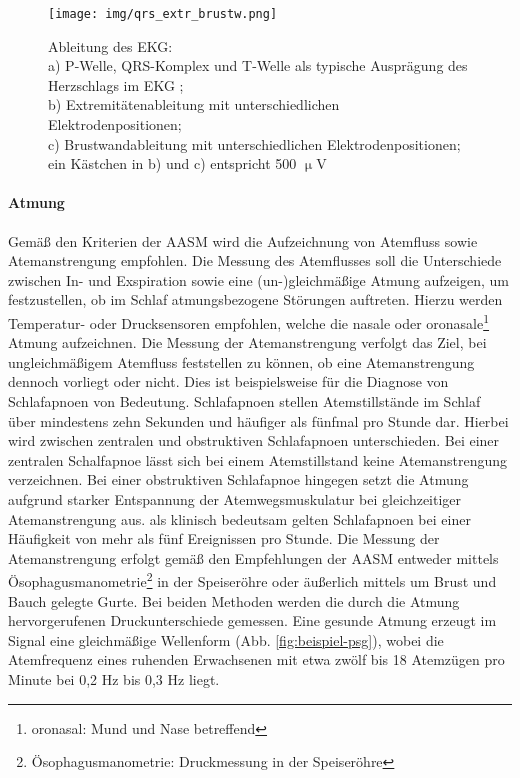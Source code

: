 \begin{figure}[H]
	\centering
	\texttt{[image: img/qrs\_extr\_brustw.png]}
	\caption[Ableitung des \acs{EKG}]{Ableitung des \acs{EKG}:\\a) P-Welle, QRS-Komplex und T-Welle als typische Ausprägung des Herzschlags im \acs{EKG} \parencite{oresick_kania_ekg_2016};\\b) Extremitätenableitung mit unterschiedlichen Elektrodenpositionen;\\c) Brustwandableitung mit unterschiedlichen Elektrodenpositionen;\\ein Kästchen in b) und c) entspricht 500 $\upmu$V \parencite{bamberger_1x1_2015}}
	\label{fig:qrs_extr_brustw}
\end{figure}

\paragraph{Atmung}
Gemäß den Kriterien der \acs{AASM} wird die Aufzeichnung von Atemfluss sowie Atemanstrengung empfohlen. Die Messung des Atemflusses soll die Unterschiede zwischen In- und Exspiration sowie eine (un-)gleichmäßige Atmung aufzeigen, um festzustellen, ob im Schlaf atmungsbezogene Störungen auftreten. Hierzu werden Temperatur- oder Drucksensoren empfohlen, welche die nasale oder oronasale\footnote{oronasal: Mund und Nase betreffend} Atmung aufzeichnen. Die Messung der Atemanstrengung verfolgt das Ziel, bei ungleichmäßigem Atemfluss feststellen zu können, ob eine Atemanstrengung dennoch vorliegt oder nicht. Dies ist beispielsweise für die Diagnose von Schlafapnoen von Bedeutung. Schlafapnoen stellen Atemstillstände im Schlaf über mindestens zehn Sekunden und häufiger als fünfmal pro Stunde dar. Hierbei wird zwischen zentralen und obstruktiven Schlafapnoen unterschieden. Bei einer zentralen Schalfapnoe lässt sich bei einem Atemstillstand keine Atemanstrengung verzeichnen. Bei einer obstruktiven Schlafapnoe hingegen setzt die Atmung aufgrund starker Entspannung der Atemwegsmuskulatur bei gleichzeitiger Atemanstrengung aus. als klinisch bedeutsam gelten Schlafapnoen bei einer Häufigkeit von mehr als fünf Ereignissen pro Stunde. Die Messung der Atemanstrengung erfolgt gemäß den Empfehlungen der \acs{AASM} entweder mittels Ösophagusmanometrie\footnote{Ösophagusmanometrie: Druckmessung in der Speiseröhre} in der Speiseröhre oder äußerlich mittels um Brust und Bauch gelegte Gurte. Bei beiden Methoden werden die durch die Atmung hervorgerufenen Druckunterschiede gemessen. Eine gesunde Atmung erzeugt im Signal eine gleichmäßige Wellenform (Abb. \ref{fig:beispiel-psg}), wobei die Atemfrequenz eines ruhenden Erwachsenen mit etwa zwölf bis 18 Atemzügen pro Minute bei 0,2 Hz bis 0,3 Hz liegt. \parencite{iber_aasm_2007, lee-chiong_sleep_2008, leroux_handbuch_2009, steffel_lunge_2014}\\

